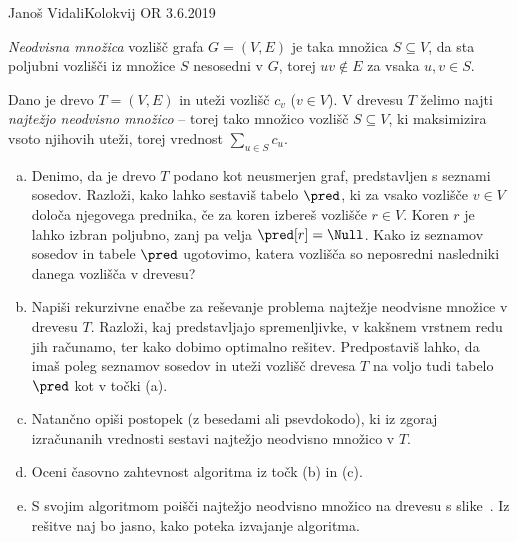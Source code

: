 \begin{naloga}{Janoš Vidali}{Kolokvij OR 3.6.2019}
\begin{vprasanje}
{\em Neodvisna množica} vozlišč grafa $G = (V, E)$
je taka množica $S \subseteq V$,
da sta poljubni vozlišči iz množice $S$ nesosedni v $G$,
torej $uv \not\in E$ za vsaka $u, v \in S$.

Dano je drevo $T = (V, E)$ in uteži vozlišč $c_v$ ($v \in V$).
V drevesu $T$ želimo najti {\em najtežjo neodvisno množico}
-- torej tako množico vozlišč $S \subseteq V$,
ki maksimizira vsoto njihovih uteži, torej vrednost $\sum_{u \in S} c_u$.

\begin{enumerate}[(a)]
\item Denimo, da je drevo $T$ podano kot neusmerjen graf,
predstavljen s seznami sosedov.
Razloži, kako lahko sestaviš tabelo $\pred$,
ki za vsako vozlišče $v \in V$ določa njegovega prednika,
če za koren izbereš vozlišče $r \in V$.
Koren $r$ je lahko izbran poljubno, zanj pa velja $\pred[r] = \Null$.
Kako iz seznamov sosedov in tabele $\pred$ ugotovimo,
katera vozlišča so neposredni nasledniki danega vozlišča v drevesu?

\item Napiši rekurzivne enačbe za reševanje problema
najtežje neodvisne množice v drevesu $T$.
Razloži, kaj pred\-stav\-lja\-jo spremenljivke,
v kakšnem vrstnem redu jih računamo, ter kako dobimo optimalno rešitev.
Predpostaviš lahko,
da imaš poleg seznamov sosedov in uteži vozlišč drevesa $T$
na voljo tudi tabelo $\pred$ kot v točki (a).

\item Natančno opiši postopek (z besedami ali psevdokodo),
ki iz zgoraj izračunanih vred\-no\-sti
sestavi najtežjo neodvisno množico v $T$.

\item Oceni časovno zahtevnost algoritma iz točk (b) in (c).

\item S svojim algoritmom poišči najtežjo neodvisno množico
na drevesu s slike~\fig.
Iz re\-šit\-ve naj bo jasno, kako poteka izvajanje algoritma.
\end{enumerate}
%
\begin{slika}
\makebox[\textwidth][c]{
\pgfslika
}
\end{slika}
\end{vprasanje}

\begin{odgovor}
\end{odgovor}
\end{naloga}
